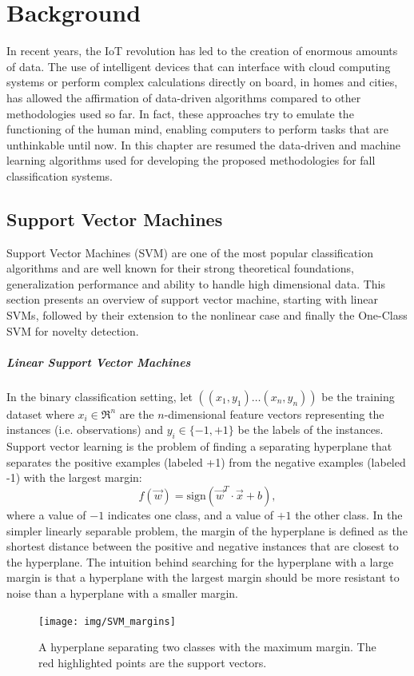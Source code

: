 \chapter{Background}
\label{ch:backg}
In recent years, the IoT revolution has led to the creation of enormous amounts of data. The use of intelligent devices that can interface with cloud computing systems or perform complex calculations directly on board, in homes and cities, has allowed the affirmation of data-driven algorithms compared to other methodologies used so far. In fact, these approaches try to emulate the functioning of the human mind, enabling computers to perform tasks that are unthinkable until now. 
In this chapter are resumed the data-driven and machine learning algorithms used for developing the proposed methodologies for fall classification systems.

\section{Support Vector Machines}
Support Vector Machines (SVM) \cite{cortes95} are one of the most popular classification algorithms and are well known for their strong theoretical foundations, generalization performance and ability to handle high dimensional data.
This section presents an overview of support vector machine, starting with linear
SVMs, followed by their extension to the nonlinear case and finally the One-Class SVM for novelty detection.

\paragraph{Linear Support Vector Machines}
In the binary classification setting, let $((x_1, y_1)\dots(x_n, y_n))$ be the training dataset where $x_i \in \Re^n$ are the $n$-dimensional feature vectors representing the instances (i.e. observations) and  $y_i \in \{-1, +1\}$ be the labels of the instances. Support vector learning is the problem of finding a separating hyperplane that separates the positive examples (labeled +1) from the negative examples (labeled -1) with the largest margin:
\begin{equation}
f(\vec{w}) =  \mbox{sign} (\vec{w}^T \cdot \vec{x} + b),
\end{equation} 
where a value of $-1$ indicates one class, and a value of $+1$ the other class.
In the simpler linearly separable problem, the margin of the hyperplane is defined as the shortest distance between the positive and negative instances that are closest to the hyperplane. The intuition behind searching for the hyperplane with a large margin is that a hyperplane with the largest margin should be more resistant to noise than a hyperplane with a smaller margin.
\begin{figure}
	\centering
	\texttt{[image: img/SVM\_margins]}
	\caption{A hyperplane separating two classes with the maximum margin. The red highlighted points are the support vectors.
	}
	\label{fig:SVM_margins}
\end{figure} 


